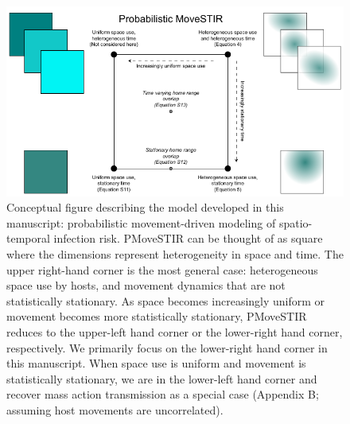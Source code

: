 ﻿\documentclass[11pt]{article}
\begin{document}
\begin{figure}
    \includegraphics[width=\textwidth]{figures/conceptual_figure_pmovestir_mod.pdf}
    \caption{Conceptual figure describing the model developed in this manuscript: probabilistic movement-driven modeling of spatio-temporal infection risk. PMoveSTIR can be thought of as square where the dimensions represent heterogeneity in space and time. The upper right-hand corner is the most general case: heterogeneous space use by hosts, and movement dynamics that are not statistically stationary.  As space becomes increasingly uniform or movement becomes more statistically stationary, PMoveSTIR reduces to the upper-left hand corner or the lower-right hand corner, respectively.  We primarily focus on the lower-right hand corner in this manuscript.  When space use is uniform and movement is statistically stationary, we are in the lower-left hand corner and recover mass action transmission as a special case (Appendix B; assuming host movements are uncorrelated).}
  \label{fig:square}
\end{figure}
\end{document}
